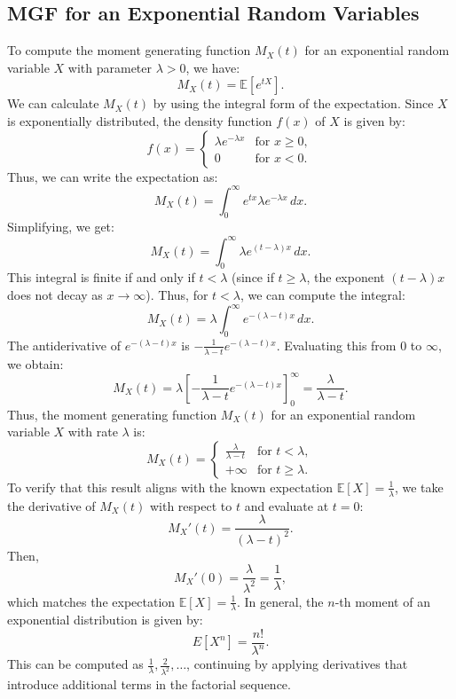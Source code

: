     \subsection{MGF for an Exponential Random Variables}
    To compute the moment generating function \( M_X(t) \) for an exponential random variable \( X \) with parameter \( \lambda > 0 \), we have:
    \[
    M_X(t) = \mathbb{E}\left[e^{tX}\right].
    \]
    We can calculate \( M_X(t) \) by using the integral form of the expectation. Since \( X \) is exponentially distributed, the density function \( f(x) \) of \( X \) is given by:
    \[
    f(x) = 
    \begin{cases} 
    \lambda e^{-\lambda x} & \text{for } x \geq 0, \\
    0 & \text{for } x < 0.
    \end{cases}
    \]
    Thus, we can write the expectation as:
    \[
    M_X(t) = \int_{0}^{\infty} e^{tx} \lambda e^{-\lambda x} \, dx.
    \]
    Simplifying, we get:
    \[
    M_X(t) = \int_{0}^{\infty} \lambda e^{(t - \lambda)x} \, dx.
    \]
    This integral is finite if and only if \( t < \lambda \) (since if \( t \geq \lambda \), the exponent \( (t - \lambda)x \) does not decay as \( x \to \infty \)). Thus, for \( t < \lambda \), we can compute the integral:
    \[
    M_X(t) = \lambda \int_{0}^{\infty} e^{-(\lambda - t)x} \, dx.
    \]
    The antiderivative of \( e^{-(\lambda - t)x} \) is \( -\frac{1}{\lambda - t} e^{-(\lambda - t)x} \). Evaluating this from 0 to \( \infty \), we obtain:
    \[
    M_X(t) = \lambda \left[-\frac{1}{\lambda - t} e^{-(\lambda - t)x} \right]_{0}^{\infty} = \frac{\lambda}{\lambda - t}.
    \]
    Thus, the moment generating function \( M_X(t) \) for an exponential random variable \( X \) with rate \( \lambda \) is:
    \[
    M_X(t) = 
    \begin{cases} 
    \frac{\lambda}{\lambda - t} & \text{for } t < \lambda, \\
    +\infty & \text{for } t \geq \lambda.
    \end{cases}
    \]
    To verify that this result aligns with the known expectation \( \mathbb{E}[X] = \frac{1}{\lambda} \), we take the derivative of \( M_X(t) \) with respect to \( t \) and evaluate at \( t = 0 \):
    \[
    M_X'(t) = \frac{\lambda}{(\lambda - t)^2}.
    \]
    Then,
    \[
    M_X'(0) = \frac{\lambda}{\lambda^2} = \frac{1}{\lambda},
    \]
    which matches the expectation \( \mathbb{E}[X] = \frac{1}{\lambda} \). \newline
    In general, the \( n \)-th moment of an exponential distribution is given by:
    \[
    E[X^n] = \frac{n!}{\lambda^n}.
    \]
    This can be computed as \( \frac{1}{\lambda}, \frac{2}{\lambda^2}, \ldots \), continuing by applying derivatives that introduce additional terms in the factorial sequence.
    
